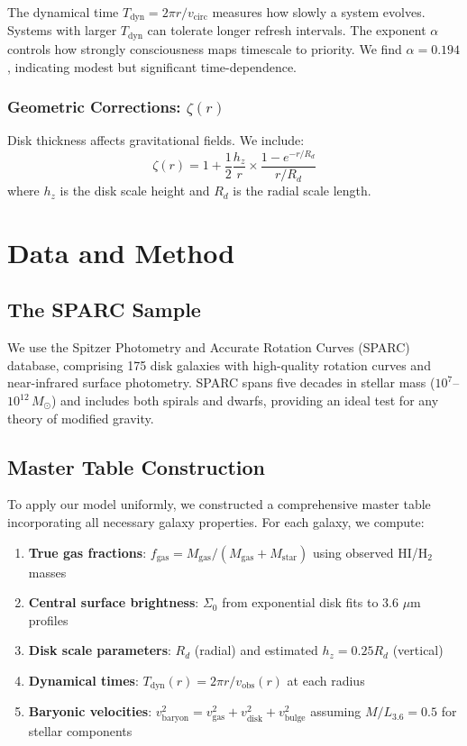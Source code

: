\documentclass[10pt,a4paper]{article}
\newcommand{\Msun}{M_{\odot}}
\begin{document}
The dynamical time $T_{\text{dyn}} = 2\pi r/v_{\text{circ}}$ measures how slowly a system evolves. Systems with larger $T_{\text{dyn}}$ can tolerate longer refresh intervals. The exponent $\alpha$ controls how strongly consciousness maps timescale to priority. We find $\alpha = 0.194$, indicating modest but significant time-dependence.

\subsubsection{Geometric Corrections: $\zeta(r)$}

Disk thickness affects gravitational fields. We include:
\begin{equation}
\zeta(r) = 1 + \frac{1}{2}\frac{h_z}{r} \times \frac{1 - e^{-r/R_d}}{r/R_d}
\end{equation}
where $h_z$ is the disk scale height and $R_d$ is the radial scale length.

\section{Data and Method}

\subsection{The SPARC Sample}

We use the Spitzer Photometry and Accurate Rotation Curves (SPARC) database, comprising 175 disk galaxies with high-quality rotation curves and near-infrared surface photometry. SPARC spans five decades in stellar mass ($10^7$--$10^{12}\,\Msun$) and includes both spirals and dwarfs, providing an ideal test for any theory of modified gravity.

\subsection{Master Table Construction}

To apply our model uniformly, we constructed a comprehensive master table incorporating all necessary galaxy properties. For each galaxy, we compute:

\begin{enumerate}
\item \textbf{True gas fractions}: $f_{\text{gas}} = M_{\text{gas}}/(M_{\text{gas}} + M_{\text{star}})$ using observed HI/H$_2$ masses
\item \textbf{Central surface brightness}: $\Sigma_0$ from exponential disk fits to 3.6 $\mu$m profiles
\item \textbf{Disk scale parameters}: $R_d$ (radial) and estimated $h_z = 0.25 R_d$ (vertical)
\item \textbf{Dynamical times}: $T_{\text{dyn}}(r) = 2\pi r/v_{\text{obs}}(r)$ at each radius
\item \textbf{Baryonic velocities}: $v_{\text{baryon}}^2 = v_{\text{gas}}^2 + v_{\text{disk}}^2 + v_{\text{bulge}}^2$ assuming $M/L_{3.6} = 0.5$ for stellar components
\end{enumerate}
\end{document}
